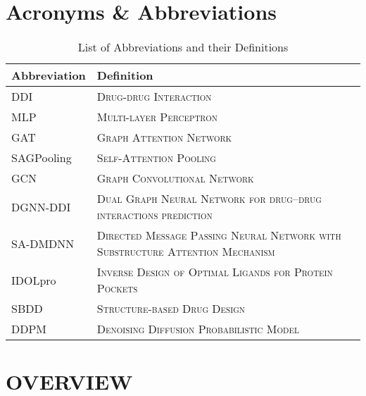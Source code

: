 \documentclass[12pt, a4paper,oneside]{book}
\begin{document}
\chapter*{Acronyms \& Abbreviations}
\begin{table}[ht]\caption{List of Abbreviations and their Definitions}
    \centering
    \begin{tabular}{|p{3cm}|p{13cm}|}
        \hline
        \textbf{Abbreviation} & \textbf{Definition} \\
        \hline
        DDI & \textsc{Drug-drug Interaction} \\
        MLP & \textsc{Multi-layer Perceptron} \\
        GAT & \textsc{Graph Attention Network} \\
        SAGPooling & \textsc{Self-Attention Pooling} \\
        GCN & \textsc{Graph Convolutional Network} \\
        DGNN-DDI & \textsc{Dual Graph Neural Network for drug–drug interactions prediction} \\
        SA-DMDNN & \textsc{Directed Message Passing Neural Network with Substructure Attention Mechanism} \\
        IDOLpro & \textsc{Inverse Design of Optimal Ligands for Protein Pockets} \\
        SBDD & \textsc{Structure-based Drug Design} \\
        DDPM & \textsc{Denoising Diffusion Probabilistic Model} \\
        \hline
    \end{tabular}
    
    \label{tab:abbreviations}
\end{table}

\chapter{\selectfont OVERVIEW}
\end{document}
